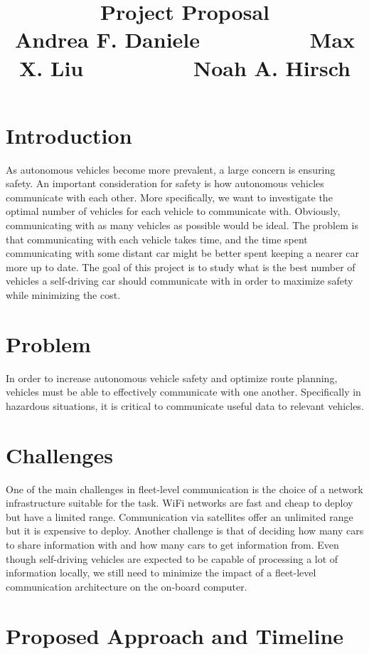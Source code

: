 \documentclass{article}
\title{Project Proposal\vspace{-6pt}\\{\large Andrea F. Daniele $\hspace{2cm}$ Max X. Liu $\hspace{2cm}$ Noah A. Hirsch }}
\begin{document}
\maketitle


\vspace{-1.2cm}

\section*{Introduction}
\vspace{-.3cm}
As autonomous vehicles become more prevalent, a large concern is ensuring safety. 
An important consideration for safety is how autonomous vehicles communicate with each other. 
More specifically, we want to investigate the optimal number of vehicles for each vehicle to communicate with. 
Obviously, communicating with as many vehicles as possible would be ideal. 
The problem is that communicating with each vehicle takes time, and the time spent communicating 
with some distant car might be better spent keeping a nearer car more up to date. 
The goal of this project is to study what is the best number of vehicles a self-driving car should 
communicate with in order to maximize safety while minimizing the cost.

\section*{Problem}
\vspace{-.3cm}
In order to increase autonomous vehicle safety and optimize route planning, vehicles must be able to effectively communicate with one another. Specifically in hazardous situations, it is critical to communicate useful data to relevant vehicles.

\section*{Challenges}
\vspace{-.3cm}
One of the main challenges in fleet-level communication is the choice of a network infrastructure suitable
for the task. WiFi networks are fast and cheap to deploy but have a limited range. Communication via satellites
offer an unlimited range but it is expensive to deploy. Another challenge is that of deciding how many cars
to share information with and how many cars to get information from. Even though self-driving vehicles are
expected to be capable of processing a lot of information locally, we still need to minimize the impact of a 
fleet-level communication architecture on the on-board computer.

\section*{Proposed Approach and Timeline}
\vspace{-.3cm}




%
%
\end{document}
